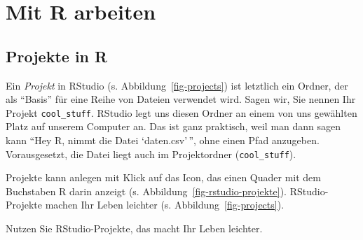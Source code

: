 \documentclass[
  a4paper,
]{scrbook}
\theoremstyle{definition}
\theoremstyle{definition}
\theoremstyle{definition}
\theoremstyle{remark}
\begin{document}
\section{Mit R arbeiten}\label{mit-r-arbeiten}

\subsection{Projekte in R}\label{projekte-in-r}

Ein \emph{Projekt} in RStudio (s. Abbildung~\ref{fig-projects}) ist
letztlich ein Ordner, der als ``Basis'' für eine Reihe von Dateien
verwendet wird. Sagen wir, Sie nennen Ihr Projekt \texttt{cool\_stuff}.
RStudio legt uns diesen Ordner an einem von uns gewählten Platz auf
unserem Computer an. Das ist ganz praktisch, weil man dann sagen kann
``Hey R, nimmt die Datei `daten.csv'\,'', ohne einen Pfad anzugeben.
Vorausgesetzt, die Datei liegt auch im Projektordner
(\texttt{cool\_stuff}).

Projekte kann anlegen mit Klick auf das Icon, das einen Quader mit dem
Buchstaben R darin anzeigt (s. Abbildung~\ref{fig-rstudio-projekte}).
RStudio-Projekte machen Ihr Leben leichter (s.
Abbildung~\ref{fig-projects}).

Nutzen Sie RStudio-Projekte, das macht Ihr Leben leichter.
\end{document}
